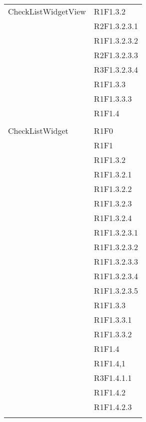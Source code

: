 \begin{center}
\begin{longtable}{|p{7cm}|p{5cm}|}
		CheckListWidgetView & R1F1.3.2 \\ & R2F1.3.2.3.1 \\ & R1F1.3.2.3.2 \\ & R2F1.3.2.3.3 \\ & R3F1.3.2.3.4 \\ & R1F1.3.3 \\ & R1F1.3.3.3 \\ & R1F1.4 \\ & \\ \hline
		CheckListWidget & R1F0 \\ & R1F1 \\ & R1F1.3.2 \\ & R1F1.3.2.1 \\ & R1F1.3.2.2 \\ & R1F1.3.2.3 \\ & R1F1.3.2.4 \\ & R1F1.3.2.3.1 \\ & R1F1.3.2.3.2 \\ & R1F1.3.2.3.3 \\ & R1F1.3.2.3.4 \\ & R1F1.3.2.3.5 \\ & R1F1.3.3 \\ & R1F1.3.3.1 \\ & R1F1.3.3.2 \\ & R1F1.4 \\ & R1F1.4,1 \\ & R3F1.4.1.1 \\ & R1F1.4.2 \\ & R1F1.4.2.3 \\ & \\ \hline

\end{longtable}
\end{center}
